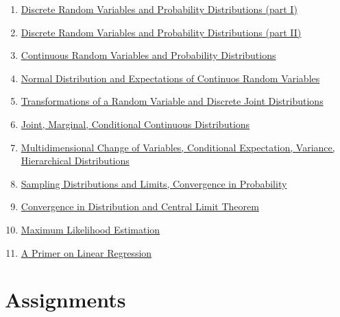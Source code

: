 \documentclass[]{book}
\providecommand{\tightlist}{%
  \setlength{\itemsep}{0pt}\setlength{\parskip}{0pt}}
\theoremstyle{definition}
\theoremstyle{definition}
\theoremstyle{definition}
\theoremstyle{remark}
\begin{document}
\begin{enumerate}
\def\labelenumi{\arabic{enumi}.}
\tightlist
\item
  \href{https://github.com/sahirbhatnagar/MATH697/blob/master/images/week3.pdf}{Discrete
  Random Variables and Probability Distributions (part I)}
\item
  \href{https://github.com/sahirbhatnagar/MATH697/blob/master/images/week4.pdf}{Discrete
  Random Variables and Probability Distributions (part II)}
\item
  \href{https://github.com/sahirbhatnagar/MATH697/blob/master/images/week5.pdf}{Continuous
  Random Variables and Probability Distributions}
\item
  \href{https://github.com/sahirbhatnagar/MATH697/blob/master/images/week6.pdf}{Normal
  Distribution and Expectations of Continuos Random Variables}
\item
  \href{https://github.com/sahirbhatnagar/MATH697/blob/master/images/week7.pdf}{Transformations
  of a Random Variable and Discrete Joint Distributions}
\item
  \href{https://github.com/sahirbhatnagar/MATH697/blob/master/images/week8.pdf}{Joint,
  Marginal, Conditional Continuous Distributions}
\item
  \href{https://github.com/sahirbhatnagar/MATH697/blob/master/images/week9.pdf}{Multidimensional
  Change of Variables, Conditional Expectation, Variance, Hierarchical
  Distributions}
\item
  \href{https://github.com/sahirbhatnagar/MATH697/blob/master/images/week10.pdf}{Sampling
  Distributions and Limits, Convergence in Probability}
\item
  \href{https://github.com/sahirbhatnagar/MATH697/blob/master/images/week11.pdf}{Convergence
  in Distribution and Central Limit Theorem}
\item
  \href{https://github.com/sahirbhatnagar/MATH697/blob/master/images/week12.pdf}{Maximum
  Likelihood Estimation}
\item
  \href{https://github.com/sahirbhatnagar/MATH697/blob/master/images/week13.pdf}{A
  Primer on Linear Regression}
\end{enumerate}

\chapter*{Assignments}\label{assignments}
\end{document}
